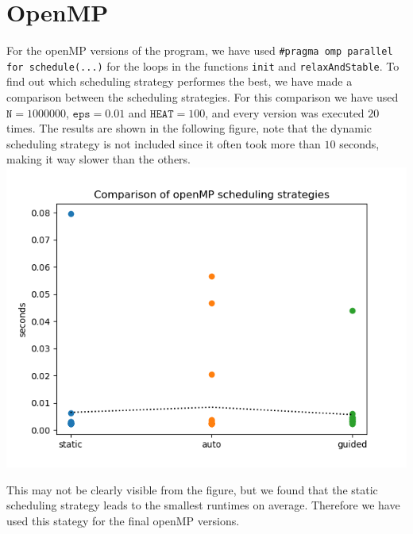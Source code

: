 \documentclass[a4paper]{article}
\begin{document}
\section{OpenMP}
For the openMP versions of the program, we have used \texttt{\#pragma omp parallel for schedule(...)} for the loops in the functions \texttt{init} and \texttt{relaxAndStable}. To find out which scheduling strategy performes the best, we have made a comparison between the scheduling strategies. For this comparison we have used $\texttt{N} = 1000000$, $\texttt{eps} = 0.01$ and $\texttt{HEAT} = 100$, and every version was executed $20$ times. The results are shown in the following figure, note that the dynamic scheduling strategy is not included since it often took more than $10$ seconds, making it way slower than the others.\\
\includegraphics[scale = 0.5]{graphs/Comparison of openMP scheduling strategies.png}

\noindent This may not be clearly visible from the figure, but we found that the static scheduling strategy leads to the smallest runtimes on average. Therefore we have used this stategy for the final openMP versions.
\end{document}
